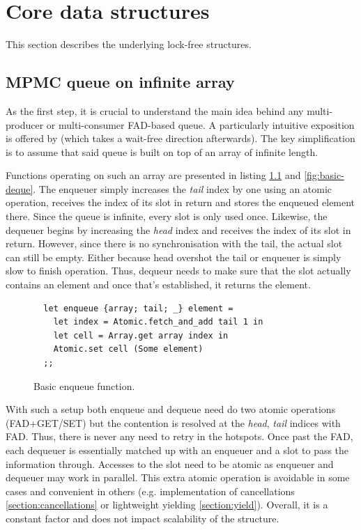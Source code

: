 \documentclass[12pt,a4paper,twoside]{report}
\begin{document}
\chapter{Core data structures}
\label{section:underlying_data_structures}

This section describes the underlying lock-free structures. 

\section{MPMC queue on infinite array}
\label{section:mpmc_queue_on_inf}
As the first step, it is crucial to understand the main idea behind any multi-producer or multi-consumer FAD-based queue. A particularly intuitive exposition is offered by \cite{Yang2016} (which takes a wait-free direction afterwards). The key simplification is to assume that said queue is built on top of an array of infinite length. 

Functions operating on such an array are presented in listing \ref{fig:basic-enqueue} and \ref{fig:basic-deque}. The enqueuer simply increases the \textit{tail} index by one using an atomic operation, receives the index of its slot in return and stores the enqueued element there. Since the queue is infinite, every slot is only used once. Likewise, the dequeuer begins by increasing the \textit{head} index and receives the index of its slot in return. However, since there is no synchronisation with the tail, the actual slot can still be empty. Either because head overshot the tail or enqueuer is simply slow to finish operation. Thus, dequeur needs to make sure that the slot actually contains an element and once that's established, it returns the element. 


\begin{figure} 
    \centering
    \begin{verbatim}
  let enqueue {array; tail; _} element = 
    let index = Atomic.fetch_and_add tail 1 in
    let cell = Array.get array index in 
    Atomic.set cell (Some element)
  ;;
    \end{verbatim}
    \caption{Basic enqueue function.}
    \label{fig:basic-enqueue}
\end{figure}



With such a setup both enqueue and dequeue need do two atomic operations (FAD+GET/SET) but the contention is resolved at the \textit{head}, \textit{tail} indices with FAD. Thus, there is never any need to retry in the hotspots. Once past the FAD, each dequeuer is essentially matched up with an enqueuer and a slot to pass the information through. Accesses to the slot need to be atomic as enqueuer and dequeuer may work in parallel. This extra atomic operation is avoidable in some cases and convenient in others (e.g. implementation of cancellations \ref{section:cancellations} or lightweight yielding \ref{section:yield}). Overall, it is a constant factor and does not impact scalability of the structure.
\end{document}
